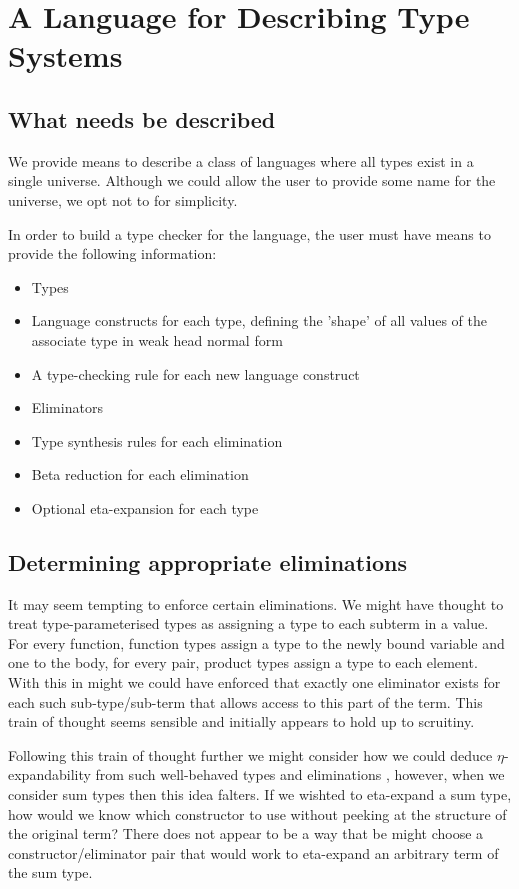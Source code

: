 \chapter{A Language for Describing Type Systems}

\section{What needs be described}

We provide means to describe a class of languages where all types
exist in a single universe. Although we could allow the user to
provide some name for the universe, we opt not to for simplicity.

In order to build a type checker for the language, the user must have
means to provide the following information:

\begin{itemize}
  \item Types
  \item Language constructs for each type, defining the 'shape' of
    all values of the associate type in weak head normal form
  \item A type-checking rule for each new language construct
  \item Eliminators
  \item Type synthesis rules for each elimination
  \item Beta reduction for each elimination
  \item Optional eta-expansion for each type
\end{itemize}

\section{Determining appropriate eliminations}
\label{appr-elim}

It may seem tempting to enforce certain eliminations. We might have
thought to treat type-parameterised types as assigning a type to each
subterm in a value. For every function, function types assign a type to
the newly bound variable and one to the body, for every pair, product
types assign a type to each element. With this in might we could have
enforced that exactly one eliminator exists for each such
sub-type/sub-term that allows access to this part of the term. This
train of thought seems sensible and initially appears to hold up to
scruitiny.

Following this train of thought further we might consider how we could
deduce $\eta$-expandability from such well-behaved types and
eliminations , however, when we consider sum types then this idea
falters. If we wishted to eta-expand a sum type, how would we know
which constructor to use without peeking at the structure of the
original term? There does not appear to be a way that be might choose
a constructor/eliminator pair that would work to eta-expand an
arbitrary term of the sum type.

